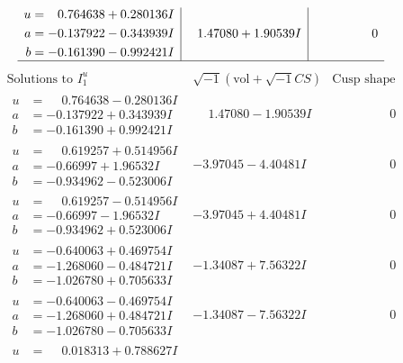 \documentclass[1p]{elsarticle_modified}
\theoremstyle{definition}
\newcommand{\I}{\sqrt{-1}}
\begin{document}
$$\begin{array}{c|c|c}
\begin{aligned}
u &= \phantom{-}0.764638 + 0.280136 I \\
a &= -0.137922 - 0.343939 I \\
b &= -0.161390 - 0.992421 I\end{aligned}
 & \phantom{-}1.47080 + 1.90539 I & \phantom{-0.000000 } 0\\
 \hline 
 \end{array}$$\newpage$$\begin{array}{c|c|c}  
\text{Solutions to }I^u_{1}& \I (\text{vol} + \sqrt{-1}CS) & \text{Cusp shape}\\
 \hline 
\begin{aligned}
u &= \phantom{-}0.764638 - 0.280136 I \\
a &= -0.137922 + 0.343939 I \\
b &= -0.161390 + 0.992421 I\end{aligned}
 & \phantom{-}1.47080 - 1.90539 I & \phantom{-0.000000 } 0 \\ \hline\begin{aligned}
u &= \phantom{-}0.619257 + 0.514956 I \\
a &= -0.66997 + 1.96532 I \\
b &= -0.934962 - 0.523006 I\end{aligned}
 & -3.97045 - 4.40481 I & \phantom{-0.000000 } 0 \\ \hline\begin{aligned}
u &= \phantom{-}0.619257 - 0.514956 I \\
a &= -0.66997 - 1.96532 I \\
b &= -0.934962 + 0.523006 I\end{aligned}
 & -3.97045 + 4.40481 I & \phantom{-0.000000 } 0 \\ \hline\begin{aligned}
u &= -0.640063 + 0.469754 I \\
a &= -1.268060 - 0.484721 I \\
b &= -1.026780 + 0.705633 I\end{aligned}
 & -1.34087 + 7.56322 I & \phantom{-0.000000 } 0 \\ \hline\begin{aligned}
u &= -0.640063 - 0.469754 I \\
a &= -1.268060 + 0.484721 I \\
b &= -1.026780 - 0.705633 I\end{aligned}
 & -1.34087 - 7.56322 I & \phantom{-0.000000 } 0 \\ \hline\begin{aligned}
u &= \phantom{-}0.018313 + 0.788627 I \\

\end{aligned}
\end{array}$$
\end{document}
